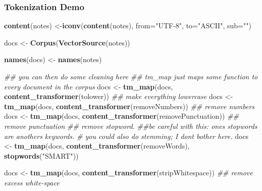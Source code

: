 \documentclass[
  shownotes,
  xcolor={svgnames},
  hyperref={colorlinks,citecolor=DarkBlue,linkcolor=DarkRed,urlcolor=DarkBlue}
  , aspectratio=169]{beamer}
\newenvironment{Shaded}{\begin{snugshade}}{\end{snugshade}}
\newcommand{\CommentTok}[1]{\textcolor[rgb]{0.56,0.35,0.01}{\textit{#1}}}
\newcommand{\DataTypeTok}[1]{\textcolor[rgb]{0.13,0.29,0.53}{#1}}
\newcommand{\KeywordTok}[1]{\textcolor[rgb]{0.13,0.29,0.53}{\textbf{#1}}}
\newcommand{\NormalTok}[1]{#1}
\newcommand{\StringTok}[1]{\textcolor[rgb]{0.31,0.60,0.02}{#1}}
\begin{document}
\begin{frame}[fragile]
\frametitle{Tokenization Demo}

\begin{scriptsize}
\begin{Shaded}
\begin{Highlighting}[]
\KeywordTok{content}\NormalTok{(notes) \textless{}{-}}\KeywordTok{iconv}\NormalTok{(}\KeywordTok{content}\NormalTok{(notes), }\DataTypeTok{from=}\StringTok{"UTF{-}8"}\NormalTok{, }\DataTypeTok{to=}\StringTok{"ASCII"}\NormalTok{, }\DataTypeTok{sub=}\StringTok{""}\NormalTok{)}

\NormalTok{docs \textless{}{-}}\StringTok{ }\KeywordTok{Corpus}\NormalTok{(}\KeywordTok{VectorSource}\NormalTok{(notes))}

\KeywordTok{names}\NormalTok{(docs) \textless{}{-}}\StringTok{ }\KeywordTok{names}\NormalTok{(notes) }

\CommentTok{\#\# you can then do some cleaning here}
\CommentTok{\#\# tm\_map just maps some function to every document in the corpus}
\NormalTok{docs \textless{}{-}}\StringTok{ }\KeywordTok{tm\_map}\NormalTok{(docs, }\KeywordTok{content\_transformer}\NormalTok{(tolower)) }\CommentTok{\#\# make everything lowercase}
\NormalTok{docs \textless{}{-}}\StringTok{ }\KeywordTok{tm\_map}\NormalTok{(docs, }\KeywordTok{content\_transformer}\NormalTok{(removeNumbers)) }\CommentTok{\#\# remove numbers}
\NormalTok{docs \textless{}{-}}\StringTok{ }\KeywordTok{tm\_map}\NormalTok{(docs, }\KeywordTok{content\_transformer}\NormalTok{(removePunctuation)) }\CommentTok{\#\# remove punctuation}
\CommentTok{\#\# remove stopword. } 
\CommentTok{\#\#be careful with this: one\textquotesingle{}s stopwords are anothers keywords.}
\CommentTok{\# you could also do stemming; I don\textquotesingle{}t bother here.}
\NormalTok{docs \textless{}{-}}\StringTok{ }\KeywordTok{tm\_map}\NormalTok{(docs, }\KeywordTok{content\_transformer}\NormalTok{(removeWords), }\KeywordTok{stopwords}\NormalTok{(}\StringTok{"SMART"}\NormalTok{))}

\NormalTok{docs \textless{}{-}}\StringTok{ }\KeywordTok{tm\_map}\NormalTok{(docs, }\KeywordTok{content\_transformer}\NormalTok{(stripWhitespace)) }\CommentTok{\#\# remove excess white{-}space}
\end{Highlighting}
\end{Shaded}


\end{scriptsize}

\end{frame}
\end{document}
